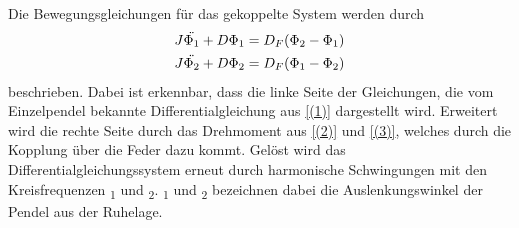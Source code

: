 \documentclass[titlepage=firstcover, captions=tableheading]{scrartcl}
\begin{document}
Die Bewegungsgleichungen für das gekoppelte System werden durch 
\begin{align}
    J\ddot{\Phi_1}+D\Phi_1=D_F(\Phi_2-\Phi_1) \notag\\
    J\ddot{\Phi_2}+D\Phi_2=D_F(\Phi_1-\Phi_2) \notag
\end{align} 
beschrieben. Dabei ist erkennbar, dass die linke Seite der Gleichungen, die vom Einzelpendel bekannte Differentialgleichung aus \ref*{(1)} dargestellt wird. Erweitert wird die rechte Seite durch das Drehmoment aus \ref*{(2)} und \ref*{(3)}, welches durch die Kopplung über die Feder dazu kommt. Gelöst wird das Differentialgleichungssystem erneut durch harmonische Schwingungen mit den Kreisfrequenzen \omega\textsubscript{1} und \omega\textsubscript{2}. \alpha\textsubscript{1} und \alpha\textsubscript{2} bezeichnen dabei die Auslenkungswinkel der Pendel aus der Ruhelage.
\newpage
\end{document}
